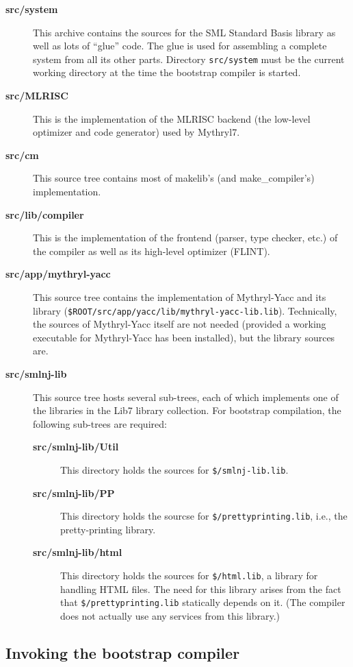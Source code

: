\begin{description}
\item[{\bf src/system}] This archive contains the sources for the SML
Standard Basis library as well as lots of ``glue'' code.  The glue is
used for assembling a complete system from all its other parts.
Directory {\tt src/system} must be the current working directory at
the time the bootstrap compiler is started.
\item[{\bf src/MLRISC}] This is the implementation of the MLRISC
backend (the low-level optimizer and code generator) used by Mythryl7.
\item[{\bf src/cm}] This source tree contains most of makelib's (and make_compiler's)
implementation.
\item[{\bf src/lib/compiler}] This is the implementation of the frontend
(parser, type checker, etc.) of the compiler as well as its high-level
optimizer (FLINT).
\item[{\bf src/app/mythryl-yacc}] This source tree contains the implementation
of Mythryl-Yacc and its library ({\tt \$ROOT/src/app/yacc/lib/mythryl-yacc-lib.lib}).
Technically, the sources of Mythryl-Yacc itself are not needed (provided a
working executable for Mythryl-Yacc has been installed), but the library
sources are.
\item[{\bf src/smlnj-lib}] This source tree hosts several sub-trees,
each of which implements one of the libraries in the Lib7 library
collection.  For bootstrap compilation, the following sub-trees are
required:
\begin{description}
\item[{\bf src/smlnj-lib/Util}] This directory holds the sources for
{\tt \$/smlnj-lib.lib}.
\item[{\bf src/smlnj-lib/PP}] This directory holds the sourcse for
{\tt \$/prettyprinting.lib}, i.e., the pretty-printing library.
\item[{\bf src/smlnj-lib/html}] This directory holds the sources for
{\tt \$/html.lib}, a library for handling HTML files.  The need for
this library arises from the fact that {\tt \$/prettyprinting.lib} statically
depends on it.  (The compiler does not actually use any services from
this library.)
\end{description}
\end{description}

\subsection{Invoking the bootstrap compiler}


